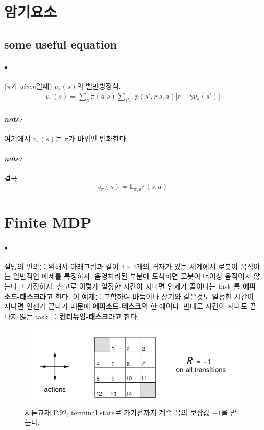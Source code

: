 \documentclass[12pt,oneside,english,a4paper]{article}
\def\ck{\paragraph{\Large$\bullet$}\Large}
\def\note{\paragraph{\Large\textit{\underline{note:}}}\Large}
\begin{document}
\section{암기요소}

\subsection{some useful equation}
\ck ($\pi$가 \emph{given}일때) $v_{\pi}(s)$의 벨만방정식.
\begin{align*}
v_{\pi}(s)=\sum_{a}\pi(a|s)\sum_{s',r}p(s',r|s,a)\Big[r+\gamma v_{\pi}(s')\Big] 
\end{align*}
\note 여기에서 $v_{\pi}(s)$는 $\pi$가 바뀌면 변화한다. 
\note 결국 
\[
v_{\pi}(s)=\mathbb{E}_{\pi,a}r(s,a)
\]

\section{Finite MDP}
\ck 설명의 편의를 위해서 아래그림과 같이 $4\times 4$개의 격자가 있는 세계에서 로봇이 움직이는 일반적인 예제를 특정하자. 음영처리된 부분에 도착하면 로봇이 더이상 움직이지 않는다고 가정하자. 참고로 이렇게 일정한 시간이 지나면 언제가 끝이나는 task 를 \textbf{에피소드-태스크}라고 한다. 이 예제를 포함하여 바둑이나 장기와 같은것도 일정한 시간이 지나면 언젠가 끝나기 때문에 \textbf{에피소드-테스크}의 한 예이다. 반대로 시간이 지나도 끝나지 않는 task 를 \textbf{컨티뉴잉-태스크}라고 한다.
\begin{figure}[h]
\center
\includegraphics[width=1\textwidth]{Fig4-1.png}
\caption{셔튼교재 P.92, terminal state로 가기전까지 계속 음의 보상값 $-1$을 받는다. }
\end{figure}
\end{document}
